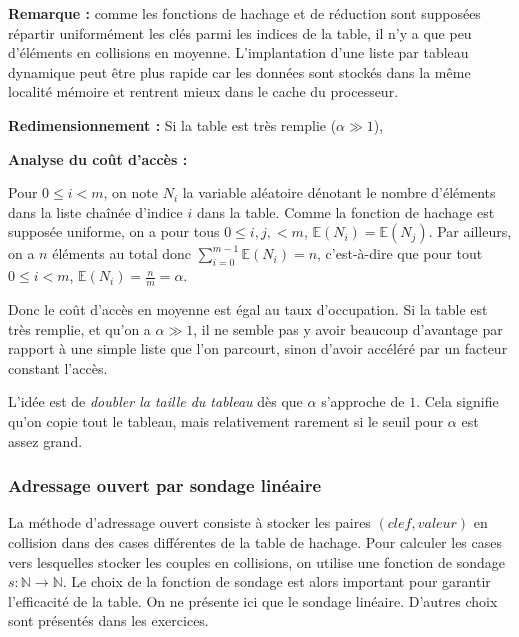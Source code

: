 \documentclass[../../../main.tex]{subfiles}
\begin{document}
\textbf{Remarque :} comme les fonctions de hachage et de réduction sont supposées répartir uniformément les clés parmi les indices de la table, il n'y a que peu d'éléments en collisions en moyenne. L'implantation d'une liste par tableau dynamique peut être plus rapide car les données sont stockés dans la même localité mémoire et rentrent mieux dans le cache du processeur.


\textbf{Redimensionnement :} Si la table est très remplie ($\alpha \gg 1$), 

\textbf{Analyse du coût d'accès :}

Pour $0\leq i < m$, on note $N_i$ la variable aléatoire dénotant le nombre d'éléments dans la liste chaînée d'indice $i$ dans la table. Comme la fonction de hachage est supposée uniforme, on a pour tous $0\leq i, j, < m$, $\mathbb{E}(N_i) = \mathbb{E}(N_j)$. Par ailleurs, on a $n$ éléments au total donc $\sum_{i = 0}^{m-1}\mathbb{E}(N_i) = n$, c'est-à-dire que pour tout $0\leq i < m$, $\mathbb{E}(N_i) = \frac{n}{m} = \alpha$.

Donc le coût d'accès en moyenne est égal au taux d'occupation. Si la table est très remplie, et qu'on a $\alpha \gg 1$, il ne semble pas y avoir beaucoup d'avantage par rapport à une simple liste que l'on parcourt, sinon d'avoir accéléré par un facteur constant l'accès.

L'idée est de \textit{doubler la taille du tableau} dès que $\alpha$ s'approche de $1$. Cela signifie qu'on copie tout le tableau, mais relativement rarement si le seuil pour $\alpha$ est assez grand.
\subsubsection{Adressage ouvert par sondage linéaire}
La méthode d'adressage ouvert consiste à stocker les paires $(clef, valeur)$ en collision dans des cases différentes de la table de hachage. Pour calculer les cases vers lesquelles stocker les couples en collisions, on utilise une fonction de sondage $s:\mathbb{N}\rightarrow \mathbb{N}$. Le choix de la fonction de sondage est alors important pour garantir l'efficacité de la table. On ne présente ici que le sondage linéaire. D'autres choix sont présentés dans les exercices.

\begin{minipage}{\textwidth}
	\begin{center}
		
	\end{center}
\end{minipage}
\end{document}
